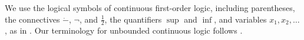 \documentclass{amsart}
\theoremstyle{definition}
\theoremstyle{remark}
\newcommand{\dotminus}{\mathbin{\dot{-}}}
\numberwithin{equation}{section}
\begin{document}
	We use the logical symbols of continuous first-order logic, including parentheses, the connectives $\dotminus$, $\neg$, and $\frac12$, the quantifiers $\sup$ and $\inf$, and variables $x_1,x_2,\ldots$, as in \cite{Yaacov2008CONTINUOUSFO}. Our terminology for unbounded continuous logic follows \cite{BenYaacov2008Unbounded}. %
	
\end{document}
